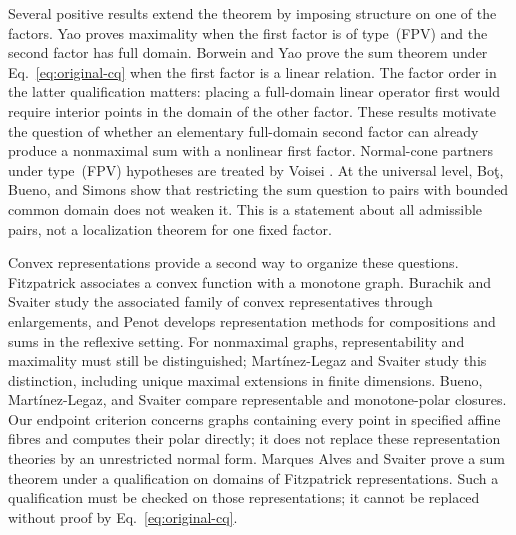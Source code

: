 \documentclass[11pt]{article}
\begin{document}
Several positive results extend the theorem by imposing structure on one
of the factors. Yao \cite{yao2010} proves maximality when the first factor
is of type~(FPV) and the second factor has full domain. Borwein and Yao
\cite{borweinyao2012} prove the sum theorem under
Eq.~\eqref{eq:original-cq} when the first factor is a linear relation.
The factor order in the latter qualification matters: placing a
full-domain linear operator first would require interior points in the
domain of the other factor. These results motivate the question of
whether an elementary full-domain second factor can already produce a
nonmaximal sum with a nonlinear first factor.
Normal-cone partners under type~(FPV) hypotheses are treated by Voisei
\cite{voisei2010}. At the universal level, Bo\c{t}, Bueno, and Simons
\cite{botbuenosimons2016} show that restricting the sum question to pairs
with bounded common domain does not weaken it. This is a statement about
all admissible pairs, not a localization theorem for one fixed factor.

Convex representations provide a second way to organize these questions.
Fitzpatrick \cite{fitzpatrick1988} associates a convex function with a
monotone graph. Burachik and Svaiter \cite{burachiksvaiter2002} study the
associated family of convex representatives through enlargements, and
Penot \cite{penot2004} develops representation methods for compositions
and sums in the reflexive setting. For nonmaximal graphs,
representability and maximality must still be distinguished;
Mart\'{i}nez-Legaz and Svaiter \cite{martinezsvaiter2005} study this
distinction, including unique maximal extensions in finite dimensions.
Bueno, Mart\'{i}nez-Legaz,
and Svaiter \cite{buenomartinezsvaiter2014} compare representable and
monotone-polar closures. Our endpoint criterion concerns graphs containing
every point in specified affine fibres and computes their polar directly; it does not
replace these representation theories by an unrestricted normal form.
Marques Alves and Svaiter \cite{marquessvaiter2012} prove a sum theorem
under a qualification on domains of Fitzpatrick representations.
Such a qualification must be checked on those representations; it cannot
be replaced without proof by Eq.~\eqref{eq:original-cq}.
\end{document}
